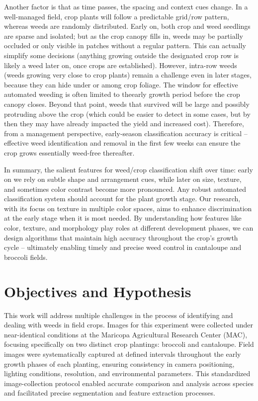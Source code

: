 \documentclass[letterpaper]{report}
\begin{document}
Another factor is that as time passes, the spacing and context cues change. In a well-managed field, crop plants will follow a predictable grid/row pattern, whereas weeds are randomly distributed. Early on, both crop and weed seedlings are sparse and isolated; but as the crop canopy fills in, weeds may be partially occluded or only visible in patches without a regular pattern. This can actually simplify some decisions (anything growing outside the designated crop row is likely a weed later on, once crops are established). However, intra-row weeds (weeds growing very close to crop plants) remain a challenge even in later stages, because they can hide under or among crop foliage. The window for effective automated weeding is often limited to theearly growth period before the crop canopy closes. Beyond that point, weeds that survived will be large and possibly protruding above the crop (which could be easier to detect in some cases, but by then they may have already impacted the yield and increased cost). Therefore, from a management perspective, early-season classification accuracy is critical – effective weed identification and removal in the first few weeks can ensure the crop grows essentially weed-free thereafter.

In summary, the salient features for weed/crop classification shift over time: early on we rely on subtle shape and arrangement cues, while later on size, texture, and sometimes color contrast become more pronounced. Any robust automated classification system should account for the plant growth stage. Our research, with its focus on texture in multiple color spaces, aims to enhance discrimination at the early stage when it is most needed. By understanding how features like color, texture, and morphology play roles at different development phases, we can design algorithms that maintain high accuracy throughout the crop’s growth cycle – ultimately enabling timely and precise weed control in cantaloupe and broccoli fields. 

\section{Objectives and Hypothesis}
This work will address multiple challenges in the process of identifying and dealing with weeds in field crops. Images for this experiment were collected under near-identical conditions at the Maricopa Agricultural Research Center (MAC), focusing specifically on two distinct crop plantings: broccoli and cantaloupe. Field images were systematically captured at defined intervals throughout the early growth phases of each planting, ensuring consistency in camera positioning, lighting conditions, resolution, and environmental parameters. This standardized image-collection protocol enabled accurate comparison and analysis across species and facilitated precise segmentation and feature extraction processes.
\end{document}
